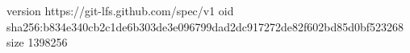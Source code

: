version https://git-lfs.github.com/spec/v1
oid sha256:b834e340cb2c1de6b303de3e096799dad2dc917272de82f602bd85d0bf523268
size 1398256
